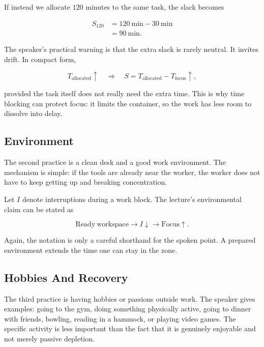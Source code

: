 If instead we allocate \(120\) minutes to the same task, the slack becomes

\begin{align}
S_{120}
&=
120\ \mathrm{min} - 30\ \mathrm{min} \\
&=
90\ \mathrm{min}.
\end{align}

The speaker's practical warning is that the extra slack is rarely neutral. It invites drift. In compact form,

\begin{equation}
T_{\mathrm{allocated}} \uparrow
\quad\Rightarrow\quad
S = T_{\mathrm{allocated}} - T_{\mathrm{focus}} \uparrow,
\end{equation}

provided the task itself does not really need the extra time. This is why time blocking can protect focus: it limits the container, so the work has less room to dissolve into delay.

\subsection{Environment}

The second practice is a clean desk and a good work environment. The mechanism is simple: if the tools are already near the worker, the worker does not have to keep getting up and breaking concentration.

Let \(I\) denote interruptions during a work block. The lecture's environmental claim can be stated as

\begin{equation}
\mathrm{Ready\ workspace}
\longrightarrow
I \downarrow
\longrightarrow
\mathrm{Focus} \uparrow .
\end{equation}

Again, the notation is only a careful shorthand for the spoken point. A prepared environment extends the time one can stay in the zone.

\subsection{Hobbies And Recovery}

The third practice is having hobbies or passions outside work. The speaker gives examples: going to the gym, doing something physically active, going to dinner with friends, bowling, reading in a hammock, or playing video games. The specific activity is less important than the fact that it is genuinely enjoyable and not merely passive depletion.

